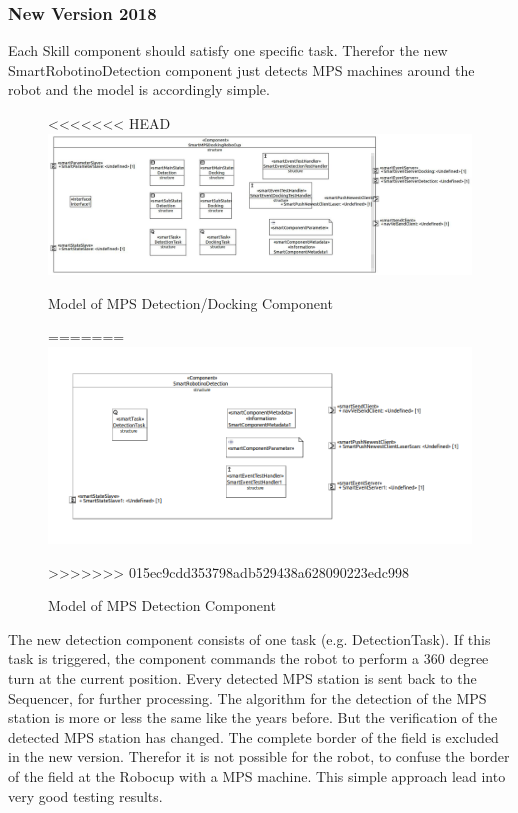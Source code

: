 \subsubsection{ New Version 2018}

Each Skill component should satisfy one specific task. Therefor the new SmartRobotinoDetection component just detects MPS machines around the robot and the model is accordingly simple.

\begin{figure}[h]
\centering
<<<<<<< HEAD
\includegraphics[scale=0.4]{pic/SmartMPSDockingRoboCup.jpg}
\caption{Model of MPS Detection/Docking Component}
\label{fig:dockingold_overview}
=======
\includegraphics[scale=0.4]{pic/detectionComponent.png}
\caption{Model of MPS Detection Component}
\label{fig:dockingNew_overview}
>>>>>>> 015ec9cdd353798adb529438a628090223edc998
\end{figure}

The new detection component consists of one task (e.g. DetectionTask). If this task is triggered, the component commands the robot to perform a 360 degree turn at the current position. Every detected MPS station is sent back to the Sequencer, for further processing. 
The algorithm for the detection of the MPS station is more or less the same like the years before. But the verification of the detected MPS station has changed. The complete border of the field is excluded in the new version. Therefor it is not possible for the robot, to confuse the border of the field at the Robocup with a MPS machine. This simple approach lead into very good testing results. 

